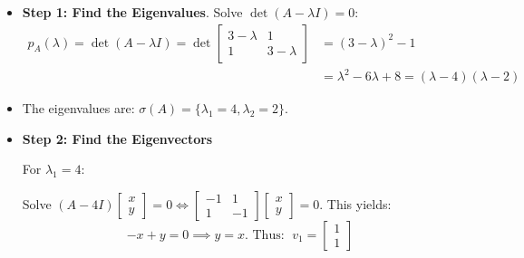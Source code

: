     \begin{frame}{}
    \begin{itemize}
    \item  \textbf{Step 1: Find the Eigenvalues}. Solve \( \det(A - \lambda I) = 0 \):
    \begin{align*}
    p_A(\lambda) = \det(A - \lambda I) =\det\begin{bmatrix}
    3 - \lambda & 1 \\
    1 & 3 - \lambda
    \end{bmatrix} & = (3 - \lambda)^2 - 1 \\
    &  = \lambda^2 - 6\lambda + 8=(\lambda - 4)(\lambda - 2)
    \end{align*}
    \item The eigenvalues are: \( \sigma(A) = \{\lambda_1 = 4, \lambda_2 = 2 \}\).
     \item \textbf{Step 2: Find the Eigenvectors}

    For \( \lambda_1 = 4 \):

    Solve \( (A - 4I)\begin{bmatrix} x \\ y \end{bmatrix}  = 0  \Longleftrightarrow \begin{bmatrix} -1 & 1 \\ 1 & -1 \end{bmatrix} \begin{bmatrix} x \\ y \end{bmatrix} = 0 \). This yields:
    \[
    -x + y = 0 \implies y = x. \text{ Thus: } \; v_1 =\begin{bmatrix} 1 \\ 1 \end{bmatrix} 
    \]
    \end{itemize}
    \end{frame}

